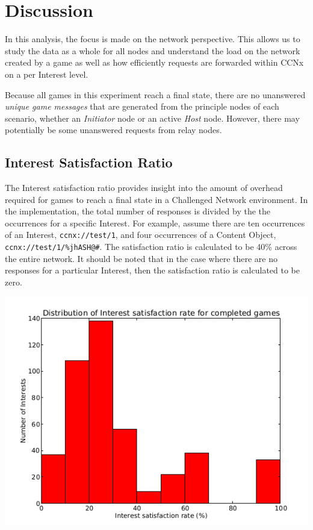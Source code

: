 \documentclass[a4paper,12pt]{report}      %
\begin{document}
\section{Discussion}

In this analysis, the focus is made on the network perspective. This allows us to study the data as a
whole for all nodes and understand the load on the network created by a game as well as how efficiently
requests are forwarded within CCNx on a per Interest level.

Because all games in this experiment reach a final state, there are no unanswered \textsl{unique game messages} that are generated
from the principle nodes of each scenario, whether an \emph{Initiator} node or an active \emph{Host} node. However,
there may potentially be some unanswered requests from relay nodes.

\subsection{Interest Satisfaction Ratio}

The Interest satisfaction ratio provides insight into the amount of overhead required for games to reach a final state in a Challenged Network environment. In the implementation, the total number of responses is divided by the the occurrences for a specific Interest. For example, assume there are ten occurrences of an Interest, \verb!ccnx://test/1!, and four occurrences of a Content Object, \verb!ccnx://test/1/%jhASH@#!. The satisfaction ratio is calculated to be 40\% across the entire network. It should be noted that in the case where there are no responses for a particular Interest, then the satisfaction ratio is calculated to be zero. 

\includegraphics[scale=0.73]{InterestSatisfactionRateHist.jpg}
\end{document}
